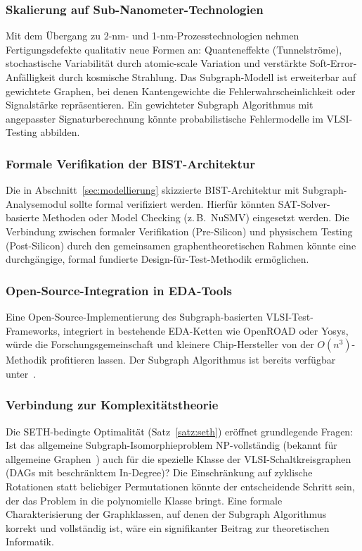 ﻿\documentclass[a4paper,12pt]{article}
\theoremstyle{definition}
\begin{document}
\subsubsection{Skalierung auf Sub-Nanometer-Technologien}

Mit dem Übergang zu 2-nm- und 1-nm-Prozesstechnologien nehmen
Fertigungs\-defekte qualitativ neue Formen an: Quanteneffekte
(Tunnel\-ströme), stochastische Variabilität durch atomic-scale
Variation und verstärkte Soft-Error-Anfälligkeit durch kosmische
Strahlung. Das Subgraph-Modell ist erweiterbar auf gewichtete Graphen,
bei denen Kantengewichte die Fehlerwahrscheinlichkeit oder
Signalstärke repräsentieren. Ein gewichteter Subgraph Algorithmus
mit angepasster Signaturberechnung könnte probabilistische
Fehlermodelle im VLSI-Testing abbilden.

\subsubsection{Formale Verifikation der BIST-Architektur}

Die in Abschnitt~\ref{sec:modellierung} skizzierte BIST-Architektur
mit Subgraph-Analysemodul sollte formal verifiziert werden.
Hierfür könnten SAT-Solver-basierte Methoden oder Model Checking
(z.\,B.\ NuSMV) eingesetzt werden. Die Verbindung zwischen formaler
Verifikation (Pre-Silicon) und physischem Testing (Post-Silicon)
durch den gemeinsamen graphen\-theoretischen Rahmen könnte eine
durchgängige, formal fundierte Design-für-Test-Methodik ermöglichen.

\subsubsection{Open-Source-Integration in EDA-Tools}

Eine Open-Source-Implementierung des Subgraph-basierten
VLSI-Test-Frameworks, integriert in bestehende EDA-Ketten wie
OpenROAD oder Yosys, würde die Forschungsgemeinschaft und kleinere
Chip-Hersteller von der $O(n^3)$-Methodik profitieren lassen.
Der Subgraph Algorithmus ist bereits verfügbar
unter~\cite{epp2026subgraph_code}.

\subsubsection{Verbindung zur Komplexitätstheorie}

Die SETH-bedingte Optimalität (Satz~\ref{satz:seth}) eröffnet
grundlegende Fragen: Ist das allgemeine Subgraph-Isomorphieproblem
NP-vollständig (bekannt für allgemeine Graphen~\cite{cook1971complexity})
auch für die spezielle Klasse der VLSI-Schaltkreisgraphen (DAGs mit
beschränktem In-Degree)? Die Einschränkung auf zyklische Rotationen
statt beliebiger Permutationen könnte der entscheidende Schritt sein,
der das Problem in die polynomielle Klasse bringt. Eine formale
Charakterisierung der Graphklassen, auf denen der Subgraph Algorithmus
korrekt und vollständig ist, wäre ein signifikanter Beitrag zur
theoretischen Informatik.
\end{document}
